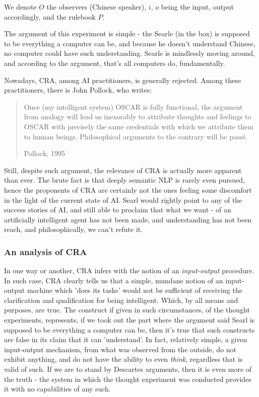 We denote $O$ the observers (Chinese speaker), $i$, $o$ being the input, output accordingly, and the rulebook $P$.

The argument of this experiment is simple - the Searle (in the box) is supposed to be everything a computer can be, and because he doesn't understand Chinese, no computer could have such understanding. Searle is mindlessly moving around, and according to the argument, that's all computers do, fundamentally.

Nowadays, CRA, among AI practitioners, is generally rejected. Among these practitioners, there is John Pollock, who writes:

\blockquote[Pollock, 1995]{Once (my intelligent system) OSCAR is fully functional, the argument from analogy will lead us inexorably to attribute thoughts and feelings to OSCAR with precisely the same credentials with which we attribute them to human beings. Philosophical arguments to the contrary will be passé.}

Still, despite such argument, the relevance of CRA is actually more apparent than ever. The brute fact is that deeply semantic NLP is rarely even pursued, hence the proponents of CRA are certainly not the ones feeling some discomfort in the light of the current state of AI. Searl would rightly point to any of the success stories of AI, and still able to proclaim that what we want - of an artificially intelligent agent has not been made, and understanding has not been reach, and philosophically, we can't refute it. 
\subsubsection{An analysis of CRA}
In one way or another, CRA infers with the notion of an \textit{input-output} procedure. In such case, CRA clearly tells us that a simple, mundane notion of an input-output machine which 'does its tasks' would not be sufficient of receiving the clarification and qualification for being intelligent. Which, by all means and purposes, are true. The construct if given in such circumstances, of the thought experiments, represents, if we took out the part where the argument said Searl is supposed to be everything a computer can be, then it's true that such constructs are false in its claim that it can 'understand'. In fact, relatively simple, a given input-output mechanism, from what was observed from the outside, do not exhibit anything, and do not have the ability to even \textit{think}, regardless that is valid of such. If we are to stand by Descartes arguments, then it is even more of the truth - the system in which the thought experiment was conducted provides it with no capabilities of any such.

